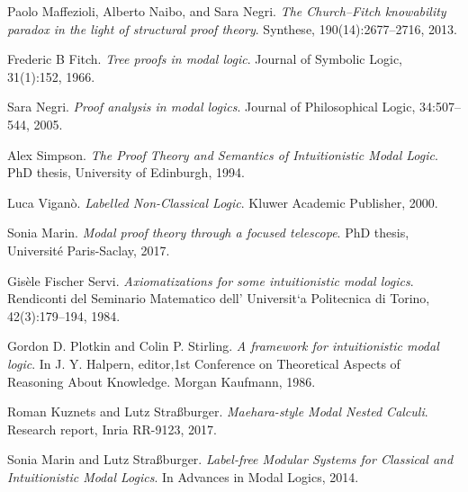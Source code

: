 \documentclass[twoside]{aiml18}
\begin{document}
\begin{thebibliography}{4}
Paolo Maffezioli, Alberto Naibo, and Sara Negri. \emph{The Church–Fitch knowability paradox in the light of structural proof theory}. Synthese, 190(14):2677–2716, 2013. 

Frederic B Fitch. \emph{Tree proofs in modal logic}. Journal of Symbolic Logic, 31(1):152, 1966.

Sara Negri. \emph{Proof analysis in modal logics}. Journal of Philosophical Logic, 34:507–544, 2005. 

Alex Simpson. \emph{The Proof Theory and Semantics of Intuitionistic Modal Logic}. PhD thesis, University of Edinburgh, 1994. 

Luca Viganò. \emph{Labelled Non-Classical Logic}. Kluwer Academic Publisher, 2000. 

Sonia Marin. \emph{Modal proof theory through a focused telescope}. PhD thesis, Université Paris-Saclay, 2017.

Gisèle Fischer Servi.\emph{ Axiomatizations for some intuitionistic modal logics}. Rendiconti del Seminario Matematico dell’ Universit`a Politecnica di Torino, 42(3):179–194, 1984.

Gordon D. Plotkin and Colin P. Stirling. \emph{A framework for intuitionistic modal logic}. In J. Y. Halpern, editor,1st Conference on Theoretical Aspects of Reasoning About Knowledge.
Morgan Kaufmann, 1986.

Roman Kuznets and Lutz Stra{\ss}burger. \emph{Maehara-style Modal Nested Calculi}. Research report, Inria RR-9123, 2017.
  
Sonia Marin and Lutz Stra{\ss}burger. \emph{Label-free Modular Systems for Classical and Intuitionistic Modal Logics}. In Advances in Modal Logics, 2014.
  
\end{thebibliography}
\end{document}
